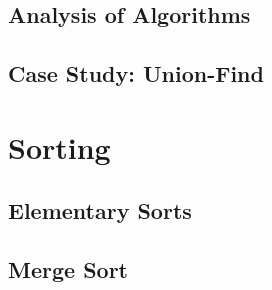 \documentclass[11pt]{report}
\begin{document}
\chapter{Analysis of Algorithms}
\label{sec:org2bacf43}
\chapter{Case Study: Union-Find}
\label{sec:org7d9466d}

\part{Sorting}
\label{sec:org55be530}
\chapter{Elementary Sorts}
\label{sec:orgd75357f}
\chapter{Merge Sort}
\label{sec:org7e751c7}
\end{document}

